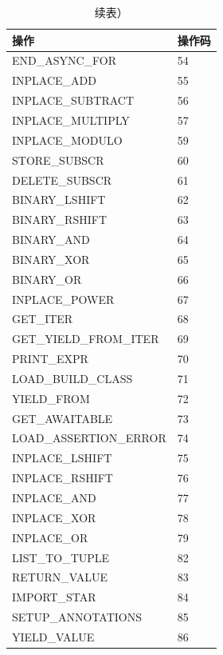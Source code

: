 \begin{table}
    \ContinuedFloat
    \centering
    \caption{续表）}\label{tab:longtable-continued}
      \begin{tabular}{|l|l|}
      \hline
      操作    & 操作码 \\
      \hline
        END\_ASYNC\_FOR & 54 \\ \hline
        INPLACE\_ADD & 55 \\ \hline
        INPLACE\_SUBTRACT & 56 \\ \hline
        INPLACE\_MULTIPLY & 57 \\ \hline
        INPLACE\_MODULO & 59 \\ \hline
        STORE\_SUBSCR & 60 \\ \hline
        DELETE\_SUBSCR & 61 \\ \hline
        BINARY\_LSHIFT & 62 \\ \hline
        BINARY\_RSHIFT & 63 \\ \hline
        BINARY\_AND & 64 \\ \hline
        BINARY\_XOR & 65 \\ \hline
        BINARY\_OR & 66 \\ \hline
        INPLACE\_POWER & 67 \\ \hline
        GET\_ITER & 68 \\ \hline
        GET\_YIELD\_FROM\_ITER & 69 \\ \hline
        PRINT\_EXPR & 70 \\ \hline
        LOAD\_BUILD\_CLASS & 71 \\ \hline
        YIELD\_FROM & 72 \\ \hline
        GET\_AWAITABLE & 73 \\ \hline
        LOAD\_ASSERTION\_ERROR & 74 \\ \hline
        INPLACE\_LSHIFT & 75 \\ \hline
        INPLACE\_RSHIFT & 76 \\ \hline
        INPLACE\_AND & 77 \\ \hline
        INPLACE\_XOR & 78 \\ \hline
        INPLACE\_OR & 79 \\ \hline
        LIST\_TO\_TUPLE & 82 \\ \hline
        RETURN\_VALUE & 83 \\ \hline
        IMPORT\_STAR & 84 \\ \hline
        SETUP\_ANNOTATIONS & 85 \\ \hline
        YIELD\_VALUE & 86 \\ \hline

\end{tabular}
\end{table}
